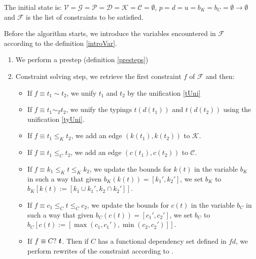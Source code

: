 \begin{defn}
    The initial state is: $\mathcal{V} = \mathcal{G} = \mathcal{P} = \mathcal{D} = \mathcal{K} = \mathcal{C} = \emptyset$, $p = d = u = b_K = b_C = \emptyset \to \emptyset$ and $\mathcal{F}$ is the list of constraints to be satisfied.

    Before the algorithm starts, we introduce the variables encountered in $\mathcal{F}$ according to the definition \ref{introVar}.
\end{defn}

\begin{defn}

    \begin{enumerate}
        \item We perform a prestep (definition \ref{presteps}) \label{prestep_step}

        \item Constraint solving step, we retrieve the first constraint $f$ of $\mathcal{F}$ and then:

        \begin{itemize}
            \item If $f \equiv t_1 \sim t_2$, we unify $t_1$ and $t_2$ by the unification \ref{tUni}

            \item If $f \equiv t_1 \sim_T t_2$, we unify the typings $t (d (t_1))$ and $t (d (t_2))$ using the unification \ref{tyUni}.

            \item If $f \equiv t_1 \leq_K t_2$, we add an edge $(k(t_1), k(t_2))$ to $\mathcal{K}$.

            \item If $f \equiv t_1 \leq_C t_2$, we add an edge $(c(t_1), c(t_2))$ to $\mathcal{C}$.

            \item If $f \equiv k_1 \leq_K t \leq_K k_2$, we update the bounds for $k(t)$ in the variable $b_K$ in such a way that given $b_K(k(t)) = [k_1', k_2']$, we set $b_K$ to $b_K[ k(t) := [k_1 \cup k_1', k_2 \cap k_2'] ]$.

            \item If $f \equiv c_1 \leq_C t \leq_C c_2$, we update the bounds for $c(t)$ in the variable $b_C$ in such a way that given $b_C(c(t)) = [c_1', c_2']$, we set $b_C$ to $b_C[ c(t) := [\max (c_1, c_1'), \min (c_2,  c_2')] ]$.

            \item If $f \equiv C?\ \boldsymbol{t}$. Then if $C$ has a functional dependency set defined in $fd$, we perform rewrites of the constraint according to .
            

\end{itemize}
\end{enumerate}
\end{defn}
